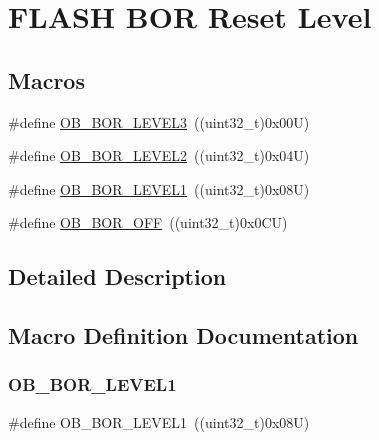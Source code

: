\hypertarget{group___f_l_a_s_h_ex___b_o_r___reset___level}{}\section{F\+L\+A\+SH B\+OR Reset Level}
\label{group___f_l_a_s_h_ex___b_o_r___reset___level}
\subsection*{Macros}
\begin{DoxyCompactItemize}
\item 
\#define \mbox{\hyperlink{group___f_l_a_s_h_ex___b_o_r___reset___level_ga3132b8202c0a345e9dd33d136714b046}{O\+B\+\_\+\+B\+O\+R\+\_\+\+L\+E\+V\+E\+L3}}~((uint32\+\_\+t)0x00\+U)
\item 
\#define \mbox{\hyperlink{group___f_l_a_s_h_ex___b_o_r___reset___level_gad678e849fcf817f6ed2d837538e8ebc2}{O\+B\+\_\+\+B\+O\+R\+\_\+\+L\+E\+V\+E\+L2}}~((uint32\+\_\+t)0x04\+U)
\item 
\#define \mbox{\hyperlink{group___f_l_a_s_h_ex___b_o_r___reset___level_ga3a888b788e75f0bc1f9add85c9ccd9d6}{O\+B\+\_\+\+B\+O\+R\+\_\+\+L\+E\+V\+E\+L1}}~((uint32\+\_\+t)0x08\+U)
\item 
\#define \mbox{\hyperlink{group___f_l_a_s_h_ex___b_o_r___reset___level_gaabc231cb1d05a94fe860f67bb5a37b12}{O\+B\+\_\+\+B\+O\+R\+\_\+\+O\+FF}}~((uint32\+\_\+t)0x0\+C\+U)
\end{DoxyCompactItemize}


\subsection{Detailed Description}


\subsection{Macro Definition Documentation}
\mbox{\label{group___f_l_a_s_h_ex___b_o_r___reset___level_ga3a888b788e75f0bc1f9add85c9ccd9d6}} 
\subsubsection{\texorpdfstring{OB\_BOR\_LEVEL1}{OB\_BOR\_LEVEL1}}
{\footnotesize\ttfamily \#define O\+B\+\_\+\+B\+O\+R\+\_\+\+L\+E\+V\+E\+L1~((uint32\+\_\+t)0x08\+U)}

